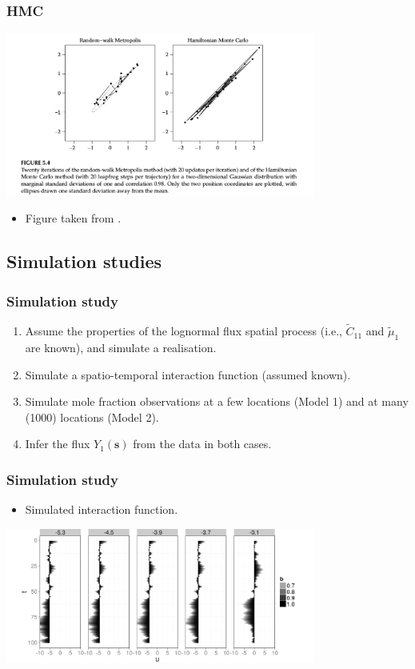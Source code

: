 \documentclass{beamer}
\newcommand{\svec} {\textbf{s}}
\begin{document}
\begin{frame}
\frametitle{HMC}

\begin{center}
\includegraphics[width=4in]{HMC2.png}
\end{center}
\begin{itemize}
\item Figure taken from \cite{Neal_2011}.
\end{itemize}
\end{frame}


\subsection{Simulation studies}


\begin{frame}
\frametitle{Simulation study}

\begin{enumerate}
\item Assume the properties of the lognormal flux spatial process (i.e., $\widetilde{C}_{11}$ and $\widetilde{\mu}_{1}$ are known), and simulate a realisation. \vfill
\item Simulate a spatio-temporal interaction function (assumed known).\vfill
\item Simulate mole fraction observations at a few locations (Model 1) and at many (1000) locations (Model 2).\vfill
\item Infer the flux $Y_1(\svec)$ from the data in both cases.\vfill
\end{enumerate}
\end{frame}

\begin{frame}
\frametitle{Simulation study}

\begin{itemize}
\item Simulated interaction function.
\end{itemize}

\begin{center}
\includegraphics[width=4in]{B_plot.png}
\end{center}
\end{frame}
\end{document}
